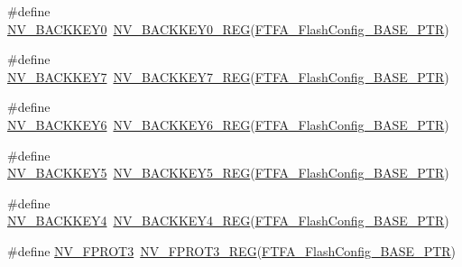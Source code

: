 \begin{DoxyCompactItemize}
\item 
\#define \hyperlink{group___n_v___register___accessor___macros_gadb8e2eb4db4de2a485b31c2a1dd393af}{N\+V\+\_\+\+B\+A\+C\+K\+K\+E\+Y0}~\hyperlink{group___n_v___register___accessor___macros_ga2fb8743f4bd1477b6df6081156659fe4}{N\+V\+\_\+\+B\+A\+C\+K\+K\+E\+Y0\+\_\+\+R\+EG}(\hyperlink{group___n_v___peripheral_ga3458652dfc38239f92682556e63596b5}{F\+T\+F\+A\+\_\+\+Flash\+Config\+\_\+\+B\+A\+S\+E\+\_\+\+P\+TR})
\item 
\#define \hyperlink{group___n_v___register___accessor___macros_gaf4c4eb8173a514a0fe632f29e80423d4}{N\+V\+\_\+\+B\+A\+C\+K\+K\+E\+Y7}~\hyperlink{group___n_v___register___accessor___macros_ga4e4a56e18420d4898e7f8804b722536e}{N\+V\+\_\+\+B\+A\+C\+K\+K\+E\+Y7\+\_\+\+R\+EG}(\hyperlink{group___n_v___peripheral_ga3458652dfc38239f92682556e63596b5}{F\+T\+F\+A\+\_\+\+Flash\+Config\+\_\+\+B\+A\+S\+E\+\_\+\+P\+TR})
\item 
\#define \hyperlink{group___n_v___register___accessor___macros_ga74544d83ca29fc4d859726eb023dadb9}{N\+V\+\_\+\+B\+A\+C\+K\+K\+E\+Y6}~\hyperlink{group___n_v___register___accessor___macros_ga66028631e0b19586c65f3db951474e08}{N\+V\+\_\+\+B\+A\+C\+K\+K\+E\+Y6\+\_\+\+R\+EG}(\hyperlink{group___n_v___peripheral_ga3458652dfc38239f92682556e63596b5}{F\+T\+F\+A\+\_\+\+Flash\+Config\+\_\+\+B\+A\+S\+E\+\_\+\+P\+TR})
\item 
\#define \hyperlink{group___n_v___register___accessor___macros_ga7b8e49b6530c2192672343b7f32ae5e8}{N\+V\+\_\+\+B\+A\+C\+K\+K\+E\+Y5}~\hyperlink{group___n_v___register___accessor___macros_ga8c8a046af59b1a140ff75cc826b355aa}{N\+V\+\_\+\+B\+A\+C\+K\+K\+E\+Y5\+\_\+\+R\+EG}(\hyperlink{group___n_v___peripheral_ga3458652dfc38239f92682556e63596b5}{F\+T\+F\+A\+\_\+\+Flash\+Config\+\_\+\+B\+A\+S\+E\+\_\+\+P\+TR})
\item 
\#define \hyperlink{group___n_v___register___accessor___macros_ga5f7ba38a88074b8b658dfe992c73482c}{N\+V\+\_\+\+B\+A\+C\+K\+K\+E\+Y4}~\hyperlink{group___n_v___register___accessor___macros_gaf87830b9bc5bb55e664df8929d49eac1}{N\+V\+\_\+\+B\+A\+C\+K\+K\+E\+Y4\+\_\+\+R\+EG}(\hyperlink{group___n_v___peripheral_ga3458652dfc38239f92682556e63596b5}{F\+T\+F\+A\+\_\+\+Flash\+Config\+\_\+\+B\+A\+S\+E\+\_\+\+P\+TR})
\item 
\#define \hyperlink{group___n_v___register___accessor___macros_ga04c3d23d8164e3fb7fb4f3e011869b5a}{N\+V\+\_\+\+F\+P\+R\+O\+T3}~\hyperlink{group___n_v___register___accessor___macros_ga7ef7bb75074b8db9da605af5ca216f74}{N\+V\+\_\+\+F\+P\+R\+O\+T3\+\_\+\+R\+EG}(\hyperlink{group___n_v___peripheral_ga3458652dfc38239f92682556e63596b5}{F\+T\+F\+A\+\_\+\+Flash\+Config\+\_\+\+B\+A\+S\+E\+\_\+\+P\+TR})

\end{DoxyCompactItemize}
